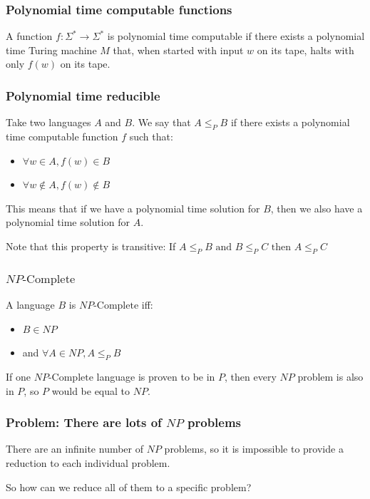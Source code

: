 \documentclass[aspectratio=169]{beamer}
\begin{document}
\begin{frame}
\frametitle{Polynomial time computable functions}

A function $f:\Sigma^* \to \Sigma^*$ is polynomial time computable if there exists a polynomial time Turing machine $M$ that, when started with input $w$ on its tape, halts with only $f(w)$ on its tape.

\end{frame}

\begin{frame}
\frametitle{Polynomial time reducible}

Take two languages $A$ and $B$. We say that $A \leq_P B$ if there exists a polynomial time computable function $f$ such that:

\begin{itemize}
    \item $\forall w \in A, f(w) \in B$
    \item $\forall w \notin A, f(w) \notin B$
\end{itemize}

This means that if we have a polynomial time solution for $B$, then we also have a polynomial time solution for $A$.

Note that this property is transitive: If $A \leq_P B \text{ and } B \leq_P C \text{ then } A \leq_P C$

\end{frame}

\begin{frame}
\frametitle{$NP\text{-Complete}$}

A language $B$ is $NP\text{-Complete}$ iff:

\begin{itemize}
    \item $B \in NP$
    \item and $\forall A \in NP, A \leq_P B$
\end{itemize}

If one $NP\text{-Complete}$ language is proven to be in $P$, then every $NP$ problem is also in $P$, so $P$ would be equal to $NP$.
\end{frame}

\begin{frame}
\frametitle{Problem: There are lots of $NP$ problems}
There are an infinite number of $NP$ problems, so it is impossible to provide a reduction to each individual problem.

So how can we reduce all of them to a specific problem?
\end{frame}
\end{document}
